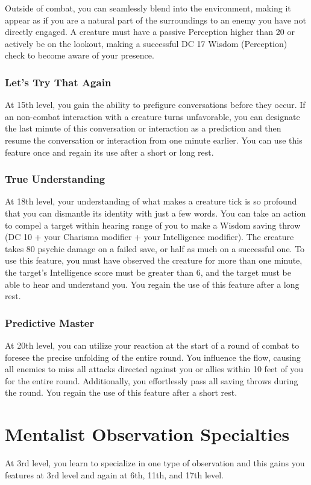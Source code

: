 Outside of combat, you can seamlessly blend into the environment, making it appear as if you are a natural part of the surroundings to an enemy you have not directly engaged. A creature must have a passive Perception higher than 20 or actively be on the lookout, making a successful DC 17 Wisdom (Perception) check to become aware of your presence.
\subsubsection{Let's Try That Again}
At 15th level, you gain the ability to prefigure conversations before they occur. If an non-combat interaction with a creature turns unfavorable, you can designate the last minute of this conversation or interaction as a prediction and then resume the conversation or interaction from one minute earlier. You can use this feature once and regain its use after a short or long rest.
\subsubsection{True Understanding}
At 18th level, your understanding of what makes a creature tick is so profound that you can dismantle its identity with just a few words. You can take an action to compel a target within hearing range of you to make a Wisdom saving throw (DC 10 + your Charisma modifier + your Intelligence modifier). The creature takes 80 psychic damage on a failed save, or half as much on a successful one. To use this feature, you must have observed the creature for more than one minute, the target's Intelligence score must be greater than 6, and the target must be able to hear and understand you. You regain the use of this feature after a long rest.
\subsubsection{Predictive Master}
At 20th level, you can utilize your reaction at the start of a round of combat to foresee the precise unfolding of the entire round. You influence the flow, causing all enemies to miss all attacks directed against you or allies within 10 feet of you for the entire round. Additionally, you effortlessly pass all saving throws during the round. You regain the use of this feature after a short rest.
\section{Mentalist Observation Specialties}
At 3rd level, you learn to specialize in one type of observation and this gains you features at 3rd level and again at 6th, 11th, and 17th level. 
